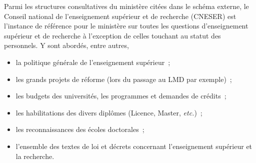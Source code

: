 Parmi les structures consultatives du minist\`ere cit\'ees dans le sch\'ema externe,
le Conseil national de l'enseignement sup\'erieur et de recherche (CNESER) est l'instance de r\'ef\'erence pour le minist\`ere sur toutes les questions d'enseignement
sup\'erieur et de recherche \`a l'exception de celles touchant au statut des personnels. Y sont abord\'es, entre autres,
\begin{itemize}
\item la politique g\'en\'erale de l'enseignement sup\'erieur~;
\item les grands projets de r\'eforme (lors du passage au LMD par
exemple)~;
\item les budgets des universit\'es, les programmes et
demandes de cr\'edits~;
\item les habilitations des divers
dipl\^omes (Licence, Master, {\em etc.})~;
\item les reconnaissances
des \'ecoles doctorales~;
\item l'ensemble des textes de loi et
d\'ecrets concernant l'enseignement sup\'erieur et la recherche.
\end{itemize}
{\small {}}

